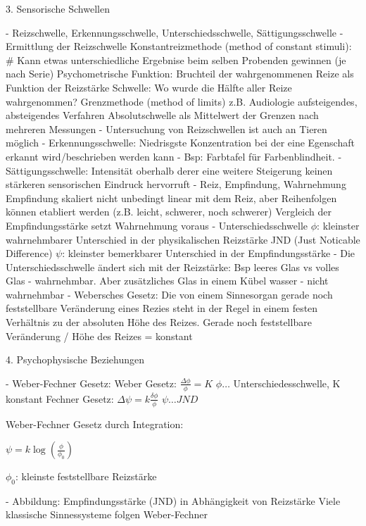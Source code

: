 3. Sensorische Schwellen

- Reizschwelle, Erkennungsschwelle, Unterschiedsschwelle, Sättigungsschwelle
- Ermittlung der Reizschwelle
    Konstantreizmethode (method of constant stimuli): #
        Kann etwas unterschiedliche Ergebnise beim selben Probenden gewinnen (je nach Serie)
        Psychometrische Funktion: Bruchteil der wahrgenommenen Reize als Funktion der Reizstärke
        Schwelle: Wo wurde die Hälfte aller Reize wahrgenommen?
    Grenzmethode (method of limits)
        z.B. Audiologie
        aufsteigendes, absteigendes Verfahren
        Absolutschwelle als Mittelwert der Grenzen nach mehreren Messungen
- Untersuchung von Reizschwellen ist auch an Tieren möglich
- Erkennungsschwelle: Niedrisgste Konzentration bei der eine Egenschaft erkannt wird/beschrieben werden kann
- Bsp: Farbtafel für Farbenblindheit.
- Sättigungsschwelle: Intensität oberhalb derer eine weitere Steigerung keinen stärkeren sensorischen Eindruck hervorruft
- Reiz, Empfindung, Wahrnehmung
    Empfindung skaliert nicht unbedingt linear mit dem Reiz, aber Reihenfolgen können etabliert werden (z.B. leicht, schwerer, noch schwerer)
    Vergleich der Empfindungsstärke setzt Wahrnehmung voraus
- Unterschiedsschwelle \(\phi\): kleinster wahrnehmbarer Unterschied in der physikalischen Reizstärke
    JND (Just Noticable Difference) \(\psi\): kleinster bemerkbarer Unterschied in der Empfindungsstärke
- Die Unterschiedsschwelle ändert sich mit der Reizstärke: Bsp leeres Glas vs volles Glas - wahrnehmbar. Aber zusätzliches Glas in einem Kübel wasser - nicht wahrnehmbar
- Webersches Gesetz: Die von einem Sinnesorgan gerade noch feststellbare Veränderung eines Rezies steht in der Regel in einem festen Verhältnis zu der absoluten Höhe des Reizes.
    Gerade noch feststellbare Veränderung / Höhe des Reizes = konstant
    
4. Psychophysische Beziehungen

- Weber-Fechner Gesetz: 
    Weber Gesetz: \(\frac{\Delta \phi}{\phi} = K\)    
    \(\phi \dots\) Unterschiedesschwelle, K konstant
    Fechner Gesetz: \(\Delta \psi = k\frac{\delta \phi}{\phi}\)
    \(\psi \dots JND\)
    
    Weber-Fechner Gesetz durch Integration: 
    
    \(\psi = k\log \left(\frac{\phi}{\phi_0}\right)\)

    \(\phi_0\): kleinste feststellbare Reizstärke

- Abbildung: Empfindungsstärke (JND) in Abhängigkeit von Reizstärke
    Viele klassische Sinnessysteme folgen Weber-Fechner
    
